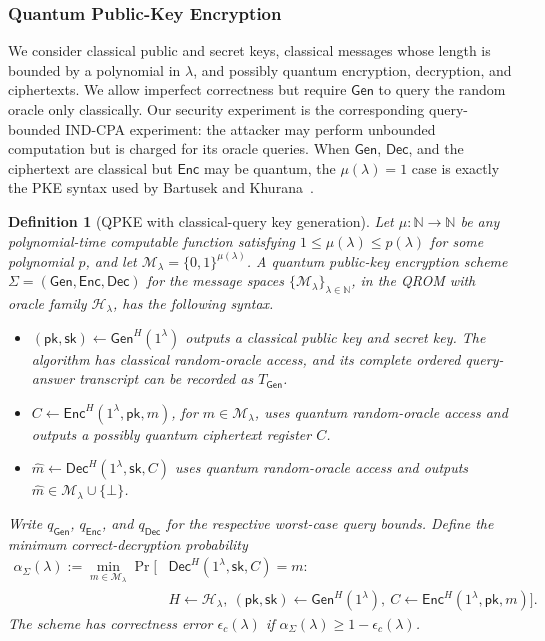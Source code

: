 \documentclass[11pt]{article}
\newcounter{algorithm}
\newtheorem{definition}[definition]{Definition}
\newcommand{\bits}{\{0,1\}}
\newcommand{\cH}{\mathcal{H}}
\newcommand{\cM}{\mathcal{M}}
\newcommand{\Gen}{\mathsf{Gen}}
\newcommand{\Enc}{\mathsf{Enc}}
\newcommand{\Dec}{\mathsf{Dec}}
\newcommand{\pk}{\mathsf{pk}}
\newcommand{\sk}{\mathsf{sk}}
\begin{document}
\subsubsection{Quantum Public-Key Encryption}

We consider classical public and secret keys, classical messages whose
length is bounded by a polynomial in \(\lambda\), and possibly quantum encryption,
decryption, and ciphertexts. We allow imperfect
correctness but require \(\Gen\) to query the random oracle only classically.
Our security experiment is the corresponding query-bounded IND-CPA
experiment: the attacker may perform unbounded computation but is charged
for its oracle queries. When \(\Gen\), \(\Dec\), and the ciphertext are
classical but \(\Enc\) may be quantum, the \(\mu(\lambda)=1\) case
is exactly the PKE syntax used by Bartusek and
Khurana~\cite[Definition~7.8]{BartusekKhurana24}.

\begin{definition}[QPKE with classical-query key generation]
\label{def:qpke}
Let \(\mu:\mathbb{N}\to\mathbb{N}\) be any polynomial-time computable
function satisfying \(1\le\mu(\lambda)\le p(\lambda)\) for some polynomial
\(p\), and let
\(\cM_\lambda=\bits^{\mu(\lambda)}\). A quantum public-key encryption scheme
\(\Sigma=(\Gen,\Enc,\Dec)\) for the message spaces
\(\{\cM_\lambda\}_{\lambda\in\mathbb N}\), in the QROM with oracle family
\(\cH_\lambda\), has the following syntax.
\begin{itemize}[leftmargin=2em]
  \item \((\pk,\sk)\leftarrow\Gen^H(1^\lambda)\) outputs a classical
  public key and secret key.  The algorithm has classical random-oracle
  access, and its complete ordered query-answer transcript can be recorded as
  \(T_{\Gen}\).
  \item \(C\leftarrow\Enc^H(1^\lambda,\pk,m)\), for
  \(m\in\cM_\lambda\), uses quantum random-oracle access and outputs a
  possibly quantum ciphertext register \(C\).
  \item \(\widehat m\leftarrow\Dec^H(1^\lambda,\sk,C)\) uses quantum
  random-oracle access and outputs
  \(\widehat m\in\cM_\lambda\cup\{\bot\}\).
\end{itemize}
Write \(q_{\Gen}\), \(q_{\Enc}\), and \(q_{\Dec}\) for the respective
worst-case query bounds. Define the minimum correct-decryption probability
\begin{align*}
  \alpha_\Sigma(\lambda)
  :=\min_{m\in\cM_\lambda}
  \Pr\bigl[&\Dec^H(1^\lambda,\sk,C)=m:\ \\
    &H\leftarrow\cH_\lambda,\
    (\pk,\sk)\leftarrow\Gen^H(1^\lambda),\
    C\leftarrow\Enc^H(1^\lambda,\pk,m)\bigr].
\end{align*}
The scheme has correctness error \(\epsilon_c(\lambda)\) if
\(\alpha_\Sigma(\lambda)\ge1-\epsilon_c(\lambda)\).
\end{definition}
\end{document}
